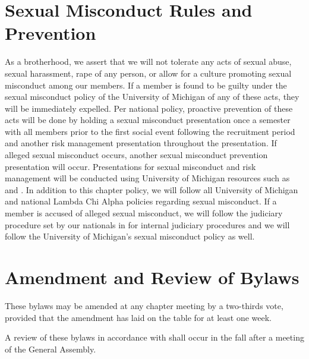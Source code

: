 \documentclass{article}
\begin{document}
\section{Sexual Misconduct Rules and Prevention}

As a brotherhood, we assert that we will not tolerate any acts of sexual abuse,
sexual harassment, rape of any person, or allow for a culture promoting sexual
misconduct among our members. If a member is found to be guilty under the sexual
misconduct policy of the University of Michigan of any of these acts, they will
be immediately expelled. Per national policy, proactive prevention of these acts
will be done by holding a sexual misconduct presentation once a semester with
all members prior to the first social event following the recruitment period and
another risk management presentation throughout the presentation. If alleged
sexual misconduct occurs, another sexual misconduct prevention presentation will
occur. Presentations for sexual misconduct and risk management will be conducted
using University of Michigan resources such as  and
. In addition to this chapter policy, we will follow all
University of Michigan and national Lambda Chi Alpha policies regarding sexual
misconduct. If a member is accused of alleged sexual misconduct, we will follow
the judiciary procedure set by our nationals in 
for internal judiciary procedures and we will follow the University of
Michigan’s sexual misconduct policy as well.

\section{Amendment and Review of Bylaws}

These bylaws may be amended at any chapter meeting by a two-thirds vote,
provided that the amendment has laid on the table for at least one week.

A review of these bylaws in accordance with 
shall occur in the fall after a meeting of the General Assembly. 
\end{document}
